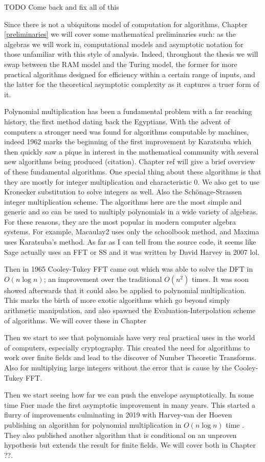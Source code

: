 TODO Come back and fix all of this

Since there is not a ubiquitous model of computation for algorithms, Chapter \ref{preliminaries} we will cover some mathematical preliminaries such: as the algebras we will work in, computational models and asymptotic notation for those unfamiliar with this style of analysis. Indeed, throughout the thesis we will swap between the RAM model and the Turing model, the former for more practical algorithms designed for efficiency within a certain range of inputs, and the latter for the theoretical asymptotic complexity as it captures a truer form of it.

Polynomial multiplication has been a fundamental problem with a far reaching history, the first method dating back the Egyptians. With the advent of computers a stronger need was found for algorithms computable by machines, indeed 1962 marks the beginning of the first improvement by Karatsuba \cite{karatsuba} which then quickly saw a pique in interest in the mathematical community with several new algorithms being produced (citation). Chapter ref will give a brief overview of these fundamental algorithms. One special thing about these algorithms is that they are mostly for integer multiplication and characteristic 0.
We also get to use Kronecker substitution to solve integers as well. Also the Sch\"{o}nage-Strassen integer multiplication scheme. The algorithms here are the most simple and generic and so can be used to multiply polynomials in a wide variety of algebras. For these reasons, they are the most popular in modern computer algebra systems. For example, Macaulay2 uses only the schoolbook method, and Maxima uses Karatsuba's method. As far as I can tell from the source code, it seems like Sage actually uses an FFT or SS and it was written by David Harvey in 2007 lol.

Then in 1965 Cooley-Tukey FFT came out which was able to solve the DFT in $O(n \log n)$; an improvement over the traditional $O(n^2)$ times. It was soon showed afterwards that it could also be applied to polynomial multiplication. This marks the birth of more exotic algorithms which go beyond simply arithmetic manipulation, and also spawned the Evaluation-Interpolation scheme of algorithms. We will cover these in Chapter \cite{eval-interp}

Then we start to see that polynomials have very real practical uses in the world of computers, especially cryptography. This created the need for algorithms to work over finite fields and lead to the discover of Number Theoretic Transforms. Also for multiplying large integers without the error that is cause by the Cooley-Tukey FFT.

Then we start seeing how far we can push the envelope asymptotically. In some time Fuer made the first asymptotic improvement in many years. This started a flurry of improvements culminating in 2019 with Harvey-van der Hoeven publishing an algorithm for polynomial multiplication in $O(n\log n)$ time \cite{nlogn}. They also published another algorithm that is conditional on an unproven hypothesis but extends the result for finite fields. We will cover both in Chapter ??.

